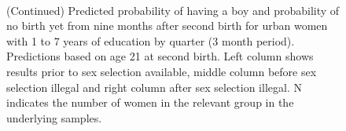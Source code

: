 \documentclass[12pt,letterpaper]{article}
\begin{document}
\begin{figure}[htpb]
{\begin{minipage}{0.31\textwidth}
        \captionsetup[subfigure]{labelformat=empty,position=top,captionskip=-1pt,farskip=-0.5pt}
        \\
        \captionsetup[subfigure]{labelformat=parens}
    \end{minipage}
}
\setcounter{subfigure}{6}
\caption{(Continued) Predicted probability of having a boy and probability of
no birth yet from nine months after second birth for urban 
women with 1 to 7 years of education by quarter (3 month period). 
Predictions based on age 21 at second birth.
Left column shows results prior to sex selection available, middle column before
sex selection illegal and right column after sex selection illegal.
N indicates the number of women in the relevant group in the underlying samples.
}
\end{figure}
\end{document}
